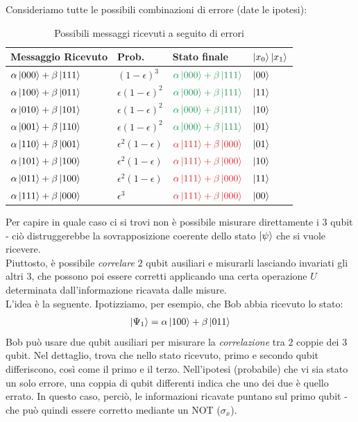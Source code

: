 \documentclass[../../InformazioneQuantistica.tex]{subfiles}
\begin{document}
Consideriamo tutte le possibili combinazioni di errore (date le ipotesi):
\begin{table}[H]
\centering
\begin{tabular}{llll}\toprule
\textbf{Messaggio Ricevuto} & \textbf{Prob.} & \textbf{Stato finale} & $\Ket{x_0}\Ket{x_1}$ \\ \midrule $\alpha \Ket{000}+\beta\Ket{111}$ & $(1-\epsilon)^3$ & $\textcolor{ForestGreen}{\alpha \ket{000} + \beta\ket{111}}$ & $\Ket{00}$\\
$\alpha \Ket{100}+ \beta\Ket{011}$ & $\epsilon(1-\epsilon)^2$  & $\textcolor{ForestGreen}{\alpha \ket{000} + \beta\ket{111}}$ & $\Ket{11}$\\
$\alpha \Ket{010} + \beta\Ket{101}$ & $\epsilon(1-\epsilon)^2$ & $\textcolor{ForestGreen}{\alpha \ket{000} + \beta\ket{111}}$ & $\Ket{10}$ \\
$\alpha \Ket{001} + \beta \Ket{110}$ & $\epsilon(1-\epsilon)^2$ & $\textcolor{ForestGreen}{\alpha \ket{000} + \beta\ket{111}}$ & $\Ket{01}$\\
$\alpha \Ket{110} + \beta\Ket{001}$ & $\epsilon^2 (1-\epsilon)$ &$\textcolor{Red}{\alpha \ket{111}+\beta\ket{000}}$ & $\Ket{01}$ \\
$\alpha\Ket{101} + \beta\Ket{100}$ & $\epsilon^2 (1-\epsilon)$ & $\textcolor{Red}{\alpha \ket{111}+\beta\ket{000}}$ & $\Ket{10}$\\
$\alpha\Ket{011} + \beta\Ket{100}$ & $\epsilon^2 (1-\epsilon)$ & $\textcolor{Red}{\alpha \ket{111}+\beta\ket{000}}$ & $\Ket{11}$\\
$\alpha \Ket{111} + \beta\Ket{000}$ & $\epsilon^3$ & $\textcolor{Red}{\alpha \ket{111}+\beta\ket{000}}$ & $\Ket{00}$ \\ \bottomrule
\end{tabular}
\caption{Possibili messaggi ricevuti a seguito di errori\label{tab:quantum-3bit}}
\end{table}

Per capire in quale caso ci si trovi non è possibile misurare direttamente i $3$ qubit - ciò distruggerebbe la sovrapposizione coerente dello stato $\Ket{\psi}$ che si vuole ricevere.\\
Piuttosto, è possibile \textit{correlare} $2$ qubit ausiliari e misurarli lasciando invariati gli altri $3$, che possono poi essere corretti applicando una certa operazione $U$ determinata dall'informazione ricavata dalle misure.\\
L'idea è la seguente. Ipotizziamo, per esempio, che Bob abbia ricevuto lo stato:
\begin{align*}
    \Ket{\Psi_1} = \alpha \Ket{100} + \beta\Ket{011}
\end{align*}
Bob può usare due qubit ausiliari per misurare la \textit{correlazione} tra $2$ coppie dei $3$ qubit. Nel dettaglio, trova che nello stato ricevuto, primo e secondo qubit differiscono, così come il primo e il terzo. Nell'ipotesi (probabile) che vi sia stato un solo errore, una coppia di qubit differenti indica che uno dei due è quello errato. In questo caso, perciò, le informazioni ricavate puntano sul primo qubit - che può quindi essere corretto mediante un NOT ($\sigma_x$).\\
\end{document}
